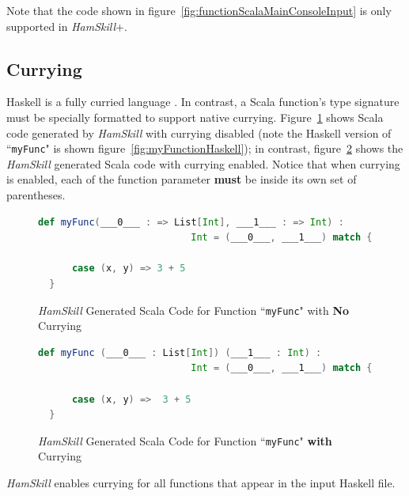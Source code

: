 \documentclass{report}
\begin{document}
Note that the code shown in figure~\ref{fig:functionScalaMainConsoleInput} is only supported in \textit{HamSkill}+.

\subsection{Currying}\label{sec:currying}

Haskell is a fully curried language \cite{learnYouAHaskell}.  In contrast, a Scala function's type signature must be specially formatted to support native currying. Figure~\ref{fig:myFuncInScalaNoCurrying} shows Scala code generated by \textit{HamSkill} with currying disabled (note the Haskell version of ``\texttt{myFunc}" is shown figure~\ref{fig:myFunctionHaskell}); in contrast, figure~\ref{fig:myFuncInScalaWithCurrying} shows the \textit{HamSkill} generated Scala code with currying enabled.  Notice that when currying is enabled, each of the function parameter \textbf{must} be inside its own set of parentheses.

\begin{figure}[H]
\begin{mdframed}
\begin{lstlisting}[basicstyle=\small, language=scala]
  def myFunc(___0___ : => List[Int], ___1___ : => Int) : 
                           Int = (___0___, ___1___) match {
      
      case (x, y) => 3 + 5
  } 
\end{lstlisting}
\end{mdframed}
\caption{\textit{HamSkill} Generated Scala Code for Function ``\texttt{myFunc}" with \textbf{No} Currying}\label{fig:myFuncInScalaNoCurrying}
\end{figure}

\begin{figure}[H]
\begin{mdframed}
\begin{lstlisting}[basicstyle=\small, language=scala]
  def myFunc (___0___ : List[Int]) (___1___ : Int) :  
                           Int = (___0___, ___1___) match {
      
      case (x, y) =>  3 + 5
  }
\end{lstlisting}
\end{mdframed}
\caption{\textit{HamSkill} Generated Scala Code for Function ``\texttt{myFunc}" \textbf{with} Currying}\label{fig:myFuncInScalaWithCurrying}
\end{figure}

\textit{HamSkill} enables currying for all functions that appear in the input Haskell file.
\end{document}
